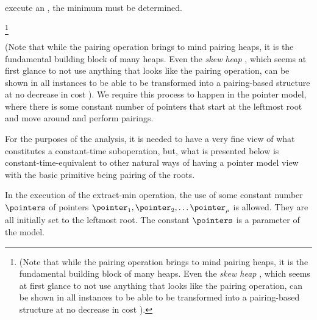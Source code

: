  execute an \opEm, the minimum must be determined. 
\begin{shortonly}
\footnote{(Note that while the pairing operation brings to mind pairing heaps, it is the fundamental building block of many heaps. Even the \emph{skew heap} \cite{DBLP:journals/siamcomp/SleatorT86}, which seems at first glance to not use anything that looks like the pairing operation, can be shown in all instances to be able to be transformed into a pairing-based structure at no decrease in cost \cite{DBLP:conf/wae/Fredman99}).}
\end{shortonly}
\begin{fullonly}
(Note that while the pairing operation brings to mind pairing heaps, it is the fundamental building block of many heaps. Even the \emph{skew heap} \cite{DBLP:journals/siamcomp/SleatorT86}, which seems at first glance to not use anything that looks like the pairing operation, can be shown in all instances to be able to be transformed into a pairing-based structure at no decrease in cost \cite{DBLP:conf/wae/Fredman99}).  We require this process to happen in the pointer model, where there is some constant number of pointers that start at the leftmost root and move around and perform pairings. 

For the purposes of the analysis, it is needed to have a very fine view of what constitutes a constant-time suboperation, but, what is presented below is constant-time-equivalent to other natural ways of having a pointer model view with the basic primitive being pairing of the roots.
\end{fullonly}

In the execution of the extract-min operation, the use of some constant number $\pointers$ of pointers $\pointer_1, \pointer_2, \ldots \pointer_\rho$ is allowed. They are all initially set to the leftmost root. The constant $\pointers$ is a parameter of the model. 


